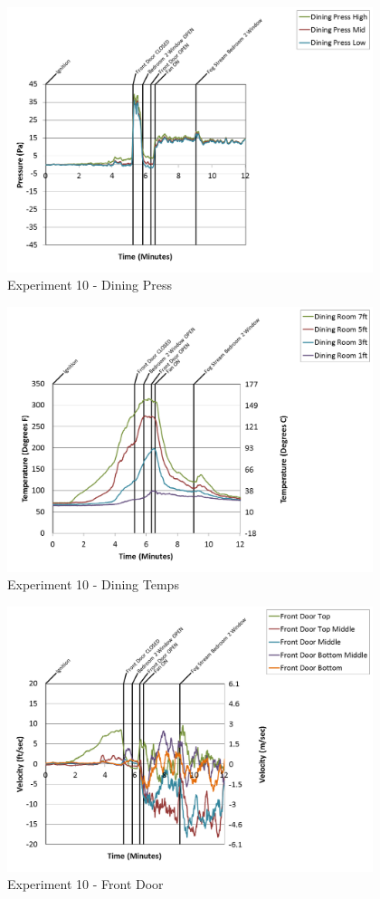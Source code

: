 \documentclass{article}
\begin{document}
\begin{appendices}
\clearpage

\begin{figure}[h!]
	\centering
	\includegraphics[height=3.05in]{0_Images/Results_Charts/Exp_10_Charts/DiningPress.png}
	\caption{Experiment 10 - Dining Press}
\end{figure}


\begin{figure}[h!]
	\centering
	\includegraphics[height=3.05in]{0_Images/Results_Charts/Exp_10_Charts/DiningTemps.png}
	\caption{Experiment 10 - Dining Temps}
\end{figure}

\clearpage

\begin{figure}[h!]
	\centering
	\includegraphics[height=3.05in]{0_Images/Results_Charts/Exp_10_Charts/FrontDoor.png}
	\caption{Experiment 10 - Front Door}
\end{figure}



\end{appendices}
\end{document}
